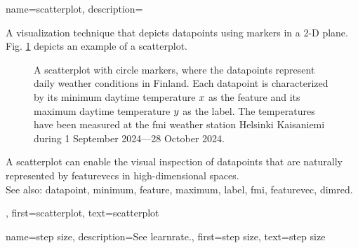 {name={scatterplot}, 
	description={A 
		visualization technique that depicts \glspl{datapoint} using markers in a 2-D plane. 
		Fig. \ref{fig_scatterplot_temp_FMI_dict} depicts an example of a scatterplot.  
		\begin{figure}[H]
			\begin{center}
				\vspace*{-10mm}
			\end{center}
			\caption{A scatterplot with circle markers, where the \glspl{datapoint} represent daily weather conditions in Finland. 
				Each \gls{datapoint} is characterized by its \gls{minimum} daytime temperature $x$ 
				as the \gls{feature} and its \gls{maximum} daytime temperature $y$ as the \gls{label}. 
				The temperatures have been measured at the \gls{fmi} weather station Helsinki Kaisaniemi 
				during 1 September 2024—28 October 2024.}
			\label{fig_scatterplot_temp_FMI_dict}
			\vspace*{-3mm}
			\end{figure}
		A scatterplot can enable the visual inspection of \glspl{datapoint} that are naturally 
		represented by \glspl{featurevec} in high-dimensional spaces.
		\\
		See also: \gls{datapoint}, \gls{minimum}, \gls{feature}, \gls{maximum}, \gls{label}, \gls{fmi}, \gls{featurevec}, \gls{dimred}.},
	first={scatterplot},
	text={scatterplot} 
}


{name={step size}, 
	description={See \gls{learnrate}.}, 
	first={step size},
	text={step size} 
}

